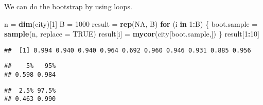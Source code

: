 \documentclass[]{book}
\newenvironment{Shaded}{\begin{snugshade}}{\end{snugshade}}
\newcommand{\KeywordTok}[1]{\textcolor[rgb]{0.13,0.29,0.53}{\textbf{#1}}}
\newcommand{\DataTypeTok}[1]{\textcolor[rgb]{0.13,0.29,0.53}{#1}}
\newcommand{\DecValTok}[1]{\textcolor[rgb]{0.00,0.00,0.81}{#1}}
\newcommand{\FloatTok}[1]{\textcolor[rgb]{0.00,0.00,0.81}{#1}}
\newcommand{\StringTok}[1]{\textcolor[rgb]{0.31,0.60,0.02}{#1}}
\newcommand{\CommentTok}[1]{\textcolor[rgb]{0.56,0.35,0.01}{\textit{#1}}}
\newcommand{\OtherTok}[1]{\textcolor[rgb]{0.56,0.35,0.01}{#1}}
\newcommand{\ControlFlowTok}[1]{\textcolor[rgb]{0.13,0.29,0.53}{\textbf{#1}}}
\newcommand{\OperatorTok}[1]{\textcolor[rgb]{0.81,0.36,0.00}{\textbf{#1}}}
\newcommand{\NormalTok}[1]{#1}
\theoremstyle{definition}
\theoremstyle{definition}
\theoremstyle{definition}
\theoremstyle{remark}
\begin{document}
We can do the bootstrap by using loops.

\begin{Shaded}
\begin{Highlighting}[]
\NormalTok{n =}\StringTok{ }\KeywordTok{dim}\NormalTok{(city)[}\DecValTok{1}\NormalTok{]}
\NormalTok{B =}\StringTok{ }\DecValTok{1000}
\NormalTok{result =}\StringTok{ }\KeywordTok{rep}\NormalTok{(}\OtherTok{NA}\NormalTok{, B)}
\ControlFlowTok{for}\NormalTok{ (i }\ControlFlowTok{in} \DecValTok{1}\OperatorTok{:}\NormalTok{B) \{}
\NormalTok{boot.sample =}\StringTok{ }\KeywordTok{sample}\NormalTok{(n, }\DataTypeTok{replace =} \OtherTok{TRUE}\NormalTok{)}
\NormalTok{result[i] =}\StringTok{ }\KeywordTok{mycor}\NormalTok{(city[boot.sample,])}
\NormalTok{\}}
\NormalTok{result[}\DecValTok{1}\OperatorTok{:}\DecValTok{10}\NormalTok{]}
\end{Highlighting}
\end{Shaded}

\begin{verbatim}
##  [1] 0.994 0.940 0.940 0.964 0.692 0.960 0.946 0.931 0.885 0.956
\end{verbatim}

\begin{Shaded}
\end{Shaded}

\begin{verbatim}
##    5%   95% 
## 0.598 0.984
\end{verbatim}

\begin{Shaded}
\end{Shaded}

\begin{verbatim}
##  2.5% 97.5% 
## 0.463 0.990
\end{verbatim}

\begin{Shaded}
\end{Shaded}
\end{document}
